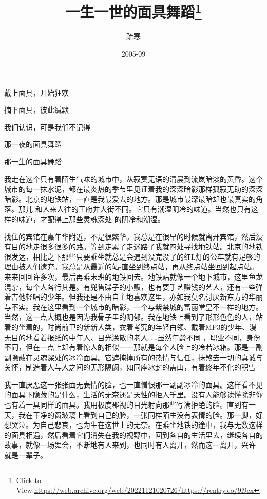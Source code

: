 \documentclass{article}
\title{一生一世的面具舞蹈\footnote{Click to View:\url{https://web.archive.org/web/20221121020726/https://rentry.co/9i9cx}}}
\author{疏寒}
\date{2005-09}
\begin{document}

\maketitle


\Large


戴上面具，开始狂欢 


摘下面具，彼此缄默 


我们认识，可是我们不记得 


那一夜的面具舞蹈 


那一生的面具舞蹈 

我走在这个只有着陌生气味的城市中，从寂寞无语的清晨到流岚暗淡的黄昏。这个城市的每一抹水泥，都在最炎热的季节里见证着我的深深暗影那样孤寂无助的深深暗影。北京的地铁站，一直是我最爱去的地方。那是城市最深最暗却也最真实的角落。那儿
\newpage
和人来人往的王府井大街不同。它只有潮湿阴冷的味道。当然也只有这样的味道，才配得上那些灵魂深处
的阴冷和潮湿。 

找住的宾馆在嘉年华附近，不是很繁华。我总是在很早的时候就离开宾馆，然后没有目的地走很多很多的路。等到走累了走迷路了我就四处寻找地铁站。北京的地铁很发达，相比之下那些只要乘坐就总是会遇到没完没了的红L灯的公车就有足够的理由被人们遗弃。我总是从最近的站-直坐到终点站，再从终点站坐回到起点站。来来回回许多次，最后再乘末班的地铁回去。地铁站就像一个地下城市，这里鱼龙混杂，每个人各行其是。有兜售碟子的小贩，也有耍手艺赚钱的艺人，还有一些弹着吉他轻唱的少年。但我还是不由自主地喜欢这里，亦如我莫名讨厌新东方的华丽与不实。我在这里看到一个城市的暗影，一个与紫禁城的富丽堂皇不一样的地方。当然，这一点大概也是因为我骨子里的阴郁。我在地铁上看到了形形色色的人，站着的坐着的，时尚前卫的新新人类，衣着考究的年轻白领、戴着MP3的少年、漫无目的地看着报纸的中年人、目光涣散的老人……虽然年龄不同
\newpage
，职业不同，身份不同，但在一点上却有着惊人的相似一一那就是每个人脸上的冷若冰箱。那是一副副隐蔽在灵魂深处的冰冷面具。它遮掩掉所有的热情与信任，抹煞去一切的真诚与关怀，制造着人与人之间的无形隔阂，如同座冰封的需山，有着终年不化的积雪
 

我一直厌恶这一张张面无表情的脸，也一直憎恨那一副副冰冷的面具。这样看不见的面具下隐藏的是什么，生活的无奈还是天性的拒人千里。没有人能够读懂除非你也有着一具同样的面具。我用极度郡视的目光射向那些写满拒绝的脸。直到有一天，我在干净的窗玻璃上看到自己的脸，一张同样陌生没有表情的脸。那一脚，好想哭泣。为自己悲哀，也为生在这世上的无奈。在乘坐地铁的途中，我与无数这样的面具相遇，然后看着它们消失在我的视野中，回到各自的生活里去，继续各自的故事，就像一场舞会，不断地有人来到，也同时有人离开，然而这一离开，兴许
就是一辈子。 
\end{document}
